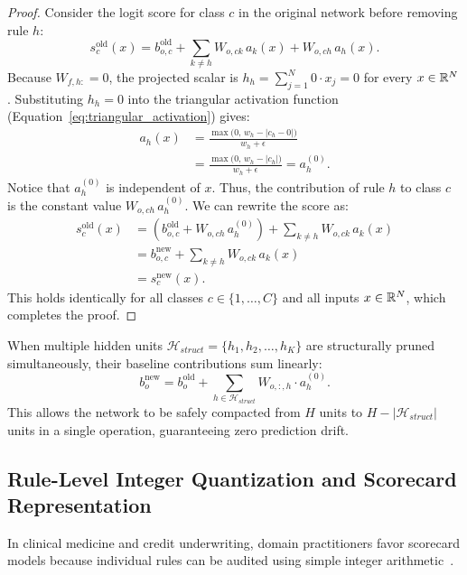 \begin{proof}
Consider the logit score for class $c$ in the original network before removing rule $h$:
\begin{equation}
s_c^{\text{old}}(x) = b_{o,c}^{\text{old}} + \sum_{k \ne h} W_{o,ck} \, a_k(x) + W_{o,ch} \, a_h(x).
\end{equation}
Because $W_{f,h:} = 0$, the projected scalar is $h_h = \sum_{j=1}^N 0 \cdot x_j = 0$ for every $x \in \mathbb{R}^N$. Substituting $h_h = 0$ into the triangular activation function (Equation~\ref{eq:triangular_activation}) gives:
\begin{align}
a_h(x) &= \frac{\max\Big(0, \, w_h - |c_h - 0|\Big)}{w_h + \epsilon} \nonumber \\
&= \frac{\max\Big(0, \, w_h - |c_h|\Big)}{w_h + \epsilon} = a_h^{(0)}.
\end{align}
Notice that $a_h^{(0)}$ is independent of $x$. Thus, the contribution of rule $h$ to class $c$ is the constant value $W_{o,ch} \, a_h^{(0)}$. We can rewrite the score as:
\begin{align}
s_c^{\text{old}}(x) &= \left( b_{o,c}^{\text{old}} + W_{o,ch} \, a_h^{(0)} \right) + \sum_{k \ne h} W_{o,ck} \, a_k(x) \\
&= b_{o,c}^{\text{new}} + \sum_{k \ne h} W_{o,ck} \, a_k(x) \\
&= s_c^{\text{new}}(x).
\end{align}
This holds identically for all classes $c \in \{1, \dots, C\}$ and all inputs $x \in \mathbb{R}^N$, which completes the proof.
\end{proof}

When multiple hidden units $\mathcal{H}_{struct} = \{h_1, h_2, \dots, h_K\}$ are structurally pruned simultaneously, their baseline contributions sum linearly:
\begin{equation}
b_o^{\text{new}} = b_o^{\text{old}} + \sum_{h \in \mathcal{H}_{struct}} W_{o,:,h} \cdot a_h^{(0)}.
\end{equation}
This allows the network to be safely compacted from $H$ units to $H - |\mathcal{H}_{struct}|$ units in a single operation, guaranteeing zero prediction drift.



\subsection{Rule-Level Integer Quantization and Scorecard Representation}
\label{subsec:scorecard}

In clinical medicine and credit underwriting, domain practitioners favor scorecard models because individual rules can be audited using simple integer arithmetic~\cite{gage2001validation,hlongwane2024transparency,ustun2016supersparse}.

